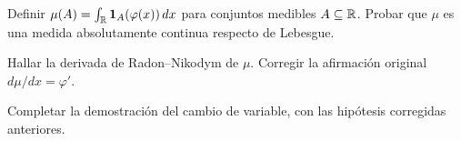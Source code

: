 \begin{ejercicio}\label{ej:v4-l02-2}
Definir $\mu(A)=\int_\mathbb R\mathbf1_A(\varphi(x))\,dx$ para conjuntos medibles $A\subseteq\mathbb R$. Probar que $\mu$ es una medida absolutamente continua respecto de Lebesgue.
\end{ejercicio}

\begin{ejercicio}\label{ej:v4-l02-3}
Hallar la derivada de Radon--Nikodym de $\mu$. Corregir la afirmación original $d\mu/dx=\varphi'$.
\end{ejercicio}

\begin{ejercicio}\label{ej:v4-l02-4}
Completar la demostración del cambio de variable, con las hipótesis corregidas anteriores.
\end{ejercicio}


